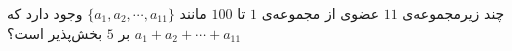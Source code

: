 \EXERCISE
چند زیرمجموعه‌ی
$11$
عضوی از مجموعه‌ی
$1$
تا
$100$
مانند
$\{a_1, a_2, \cdots, a_{11}\}$
وجود دارد که
$a_1 + a_2 + \cdots + a_{11}$
بر
$5$
بخش‌پذیر است؟
